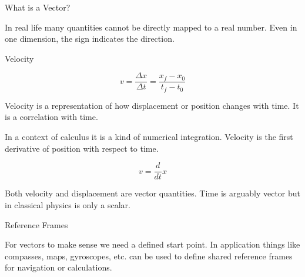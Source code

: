 \documentclass{report}
\begin{document}
\begin{description}
    \item What is a Vector? 
        \begin{mdframed}
            In real life many quantities cannot be directly
            mapped to a real number. Even in one dimension, the
            sign indicates the direction.
        \end{mdframed}
        {\large Velocity}
        \begin{mdframed}
            \begin{displaymath}
                v = \frac{\Delta x}{\Delta t}
                = \frac{x_f - x_0}{t_f - t_0}
            \end{displaymath}

            Velocity is a representation of how 
            displacement or position changes with time.
            It is a correlation with time.

            In a context of calculus it is a kind of numerical
            integration. Velocity is the first derivative of
            position with respect to time.

            \begin{displaymath}
                v = \frac{d}{dt}x
            \end{displaymath}

            Both velocity and displacement are vector quantities.
            Time is arguably vector but in classical physics is
            only a scalar.
            
            \begin{center}
            \end{center}

            \begin{center}
            \end{center}

        \end{mdframed}
    \item Reference Frames
        \begin{mdframed}
           For vectors to make sense we need a defined start point.
           In application things like compasses, maps, gyroscopes, etc.
           can be used to define shared reference frames for navigation
           or calculations.


\end{mdframed}
\end{description}
\end{document}
